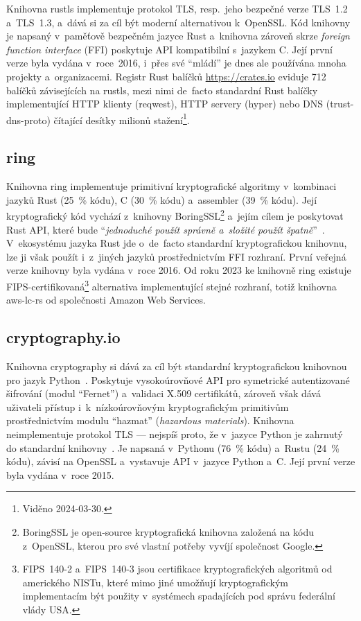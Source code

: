 Knihovna rustls implementuje protokol TLS, resp.\ jeho bezpečné verze TLS~1.2 a~TLS~1.3, a~dává si za cíl být moderní alternativou k~OpenSSL. Kód knihovny je napsaný v~paměťově bezpečném jazyce Rust a~knihovna zároveň skrze \emph{foreign function interface} (FFI) poskytuje API kompatibilní s~jazykem C. Její první verze byla vydána v~roce~2016, i~přes své ``mládí'' je dnes ale používána mnoha projekty a~organizacemi. Registr Rust balíčků \url{https://crates.io} eviduje 712 balíčků závisejících na rustls, mezi nimi de~facto standardní Rust balíčky implementující HTTP klienty (reqwest), HTTP servery (hyper) nebo DNS (trust-dns-proto) čítající desítky milionů stažení\footnote{Viděno 2024-03-30.}.

\subsection*{ring}

Knihovna ring implementuje primitivní kryptografické algoritmy v~kombinaci jazyků Rust (25~\% kódu), C (30~\% kódu) a~assembler (39~\% kódu). Její kryptografický kód vychází z~knihovny BoringSSL\footnote{BoringSSL je open-source kryptografická knihovna založená na kódu z~OpenSSL, kterou pro své vlastní potřeby vyvíjí společnost Google.} a~jejím cílem je poskytovat Rust API, které bude ``\textit{jednoduché použít správně a~složité použít špatně}''~\cite{ringgithub}. V~ekosystému jazyka Rust jde o~de~facto standardní kryptografickou knihovnu, lze ji však použít i~z~jiných jazyků prostřednictvím FFI rozhraní. První veřejná verze knihovny byla vydána v~roce 2016. Od roku 2023 ke knihovně ring existuje FIPS-certifikovaná\footnote{FIPS~140-2 a~FIPS~140-3 jsou certifikace kryptografických algoritmů od amerického NISTu, které mimo jiné umožňují kryptografickým implementacím být použity v~systémech spadajících pod správu federální vlády USA.} alternativa implementující stejné rozhraní, totiž knihovna aws-lc-rs od společnosti Amazon Web Services.

\subsection*{cryptography.io}

Knihovna cryptography si dává za cíl být standardní kryptografickou knihovnou pro jazyk Python~\cite{pycagithub}. Poskytuje vysokoúrovňové API pro symetrické autentizované šifrování (modul ``Fernet'') a~validaci X.509 certifikátů, zároveň však dává uživateli přístup i~k~nízkoúrovňovým kryptografickým primitivům prostřednictvím modulu ``hazmat'' (\textit{hazardous materials}). Knihovna neimplementuje protokol TLS --- nejspíš proto, že v~jazyce Python je zahrnutý do standardní knihovny~\cite{pythontls}. Je napsaná v~Pythonu (76~\% kódu) a~Rustu (24~\% kódu), závisí na OpenSSL a~vystavuje API v~jazyce Python a~C. Její první verze byla vydána v~roce 2015.

